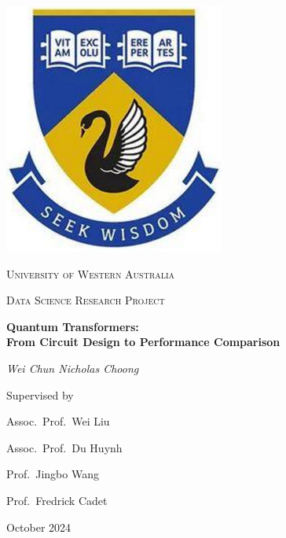 \begin{titlepage}

  \thispagestyle{empty}
  \vspace*{\fill}

  \begin{center}

    \begin{center}
      \includegraphics[width=0.25\linewidth]{img/uwa.PNG}
    \end{center}

    \vspace{1cm}
    {\scshape\LARGE University of Western Australia \par}
    \vspace{1.25cm}
    {\scshape\Large Data Science Research Project\par}
    \vspace{1.5cm}

    {\Large\bfseries Quantum Transformers: \\
    From Circuit Design to Performance Comparison\par}

    \vspace{1.5cm}
    {\Large\itshape Wei Chun Nicholas Choong\par}
    \vspace{1.25cm}

    \vspace{1.5cm}
    Supervised by\par
    Assoc.~Prof.~Wei Liu \par
    Assoc.~Prof.~Du Huynh \par
    Prof.~Jingbo Wang \par
    Prof.~Fredrick Cadet \par
    \vspace{1.5cm}
    \large October 2024\par

  \end{center}

  \vspace*{\fill}
  \clearpage
  \restoregeometry
\end{titlepage}
